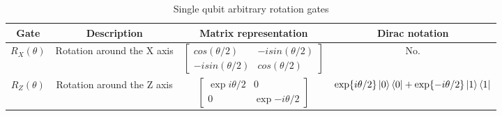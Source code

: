 \begin{table}[h]
    \centering
    \begin{tabular}{c|c|c|c}
        Gate & Description &  Matrix representation & Dirac notation \\ \hline
        $\boxed{R_X(\theta)}$ & Rotation around the X axis 
        & $\begin{bmatrix} cos(\theta/2) & -isin(\theta/2) \\ -isin(\theta/2) & cos(\theta/2) \end{bmatrix}$ 
        & No.\\
        $\boxed{R_Z(\theta)}$ & Rotation around the Z axis 
        & $\begin{bmatrix} \exp{i\theta/2} & 0 \\ 0 & \exp{-i\theta/2} \end{bmatrix}$ 
        & $\exp{i\theta/2}\left\vert{0}\right\rangle\left\langle{0}\right\vert + \exp{-i\theta/2}\left\vert{1}\right\rangle\left\langle{1}\right\vert $\\
    \end{tabular}
    \caption{Single qubit arbitrary rotation gates}
    \label{tab:singlequbitrotationgates}
\end{table}
\vspace{-10pt}
